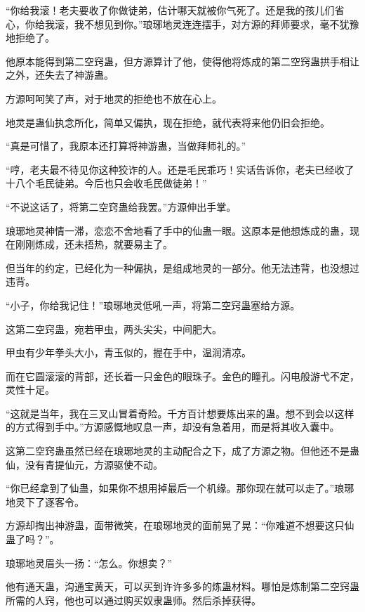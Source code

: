 
\begin{this_body}



“你给我滚！老夫要收了你做徒弟，估计哪天就被你气死了。还是我的孩儿们省心，你给我滚，我不想见到你。”琅琊地灵连连摆手，对方源的拜师要求，毫不犹豫地拒绝了。

他原本能得到第二空窍蛊，但方源算计了他，使得他将炼成的第二空窍蛊拱手相让之外，还失去了神游蛊。

方源呵呵笑了声，对于地灵的拒绝也不放在心上。

地灵是蛊仙执念所化，简单又偏执，现在拒绝，就代表将来他仍旧会拒绝。

“真是可惜了，我原本还打算将神游蛊，当做拜师礼的。”

“哼，老夫最不待见你这种狡诈的人。还是毛民乖巧！实话告诉你，老夫已经收了十八个毛民徒弟。今后也只会收毛民做徒弟！”

“不说这话了，将第二空窍蛊给我罢。”方源伸出手掌。

琅琊地灵神情一滞，恋恋不舍地看了手中的仙蛊一眼。这原本是他想炼成的蛊，现在刚刚炼成，还未捂热，就要易主了。

但当年的约定，已经化为一种偏执，是组成地灵的一部分。他无法违背，也没想过违背。

“小子，你给我记住！”琅琊地灵低吼一声，将第二空窍蛊塞给方源。

这第二空窍蛊，宛若甲虫，两头尖尖，中间肥大。

甲虫有少年拳头大小，青玉似的，握在手中，温润清凉。

而在它圆滚滚的背部，还长着一只金色的眼珠子。金色的瞳孔。闪电般游弋不定，灵性十足。

“这就是当年，我在三叉山冒着奇险。千方百计想要炼出来的蛊。想不到会以这样的方式得到手中。”方源感慨地叹息一声，却没有急着用，而是将其收入囊中。

这第二空窍蛊虽然已经在琅琊地灵的主动配合之下，成了方源之物。但他还不是蛊仙，没有青提仙元，方源驱使不动。

“你已经拿到了仙蛊，如果你不想用掉最后一个机缘。那你现在就可以走了。”琅琊地灵下了逐客令。

方源却掏出神游蛊，面带微笑，在琅琊地灵的面前晃了晃：“你难道不想要这只仙蛊了吗？”。

琅琊地灵眉头一扬：“怎么。你想卖？”

他有通天蛊，沟通宝黄天，可以买到许许多多的炼蛊材料。哪怕是炼制第二空窍蛊所需的人窍，他也可以通过购买奴隶蛊师。然后杀掉获得。


\end{this_body}
